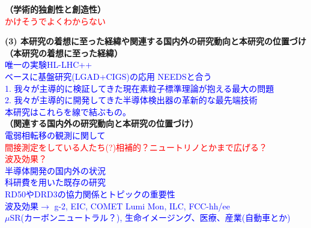 \documentclass[11pt,a4j,dvipdfmx]{jarticle} 					%
\newcommand{\研究課題名}{新型半導体検出器を用いた真空の解明}
\newcommand{\研究機関名}{高エネルギー加速器研究機構}
\newcommand{\研究代表者氏名}{中村浩二}
\newcommand{\研究期間の最終元号年度}{10}  %
\newcommand{\TODO}[1]{\textcolor{red}{#1}}
\newcommand{\MEMO}[1]{\textcolor{blue}{#1}}
\begin{document}
\noindent\textbf{（学術的独創性と創造性）}\\
\MEMO{
\TODO{かけそうでよくわからない}\\
}


\noindent\colorbox[gray]{0.9}{\textbf{(3) 本研究の着想に至った経緯や関連する国内外の研究動向と本研究の位置づけ}}\\
\noindent\textbf{（本研究の着想に至った経緯）}\\
\MEMO{
   唯一の実験HL-LHC++\\
  ベースに基盤研究(LGAD+CIGS)の応用 NEEDSと合う\\
  1. 我々が主導的に検証してきた現在素粒子標準理論が抱える最大の問題\\
  2. 我々が主導的に開発してきた半導体検出器の革新的な最先端技術\\
  本研究はこれらを線で結ぶもの。\\
}
\noindent\textbf{（関連する国内外の研究動向と本研究の位置づけ）}\\
\MEMO{
電弱相転移の観測に関して\\
    \hspace{1cm} \TODO{間接測定をしている人たち(?)相補的？ニュートリノとかまで広げる？}\\
    \hspace{1cm} \TODO{波及効果？}\\
半導体開発の国内外の状況\\
    \hspace{1cm} 科研費を用いた既存の研究\\
    \hspace{1cm} RD50やDRD3の協力関係とトピックの重要性\\
    \hspace{1cm} 波及効果$\to$ g-2, EIC, COMET Lumi Mon, ILC, FCC-hh/ee\\
    \hspace{3cm} $\mu$SR(カーボンニュートラル？), 生命イメージング、医療、産業(自動車とか)
}
\end{document}

